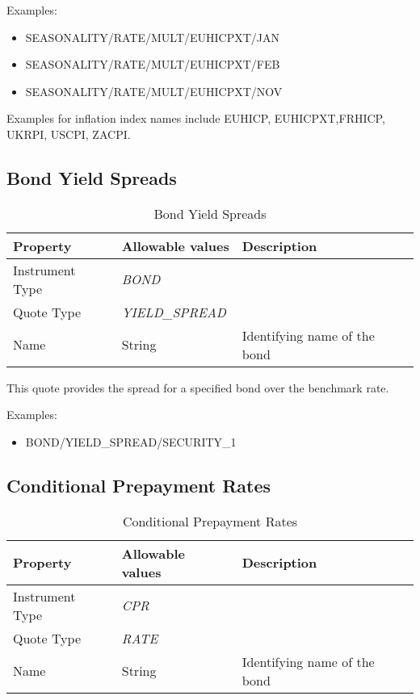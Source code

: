 \medskip
Examples:
\begin{itemize}
\item SEASONALITY/RATE/MULT/EUHICPXT/JAN
\item SEASONALITY/RATE/MULT/EUHICPXT/FEB
\item SEASONALITY/RATE/MULT/EUHICPXT/NOV
\end{itemize}

Examples for inflation index names include EUHICP, EUHICPXT,FRHICP, UKRPI, USCPI, ZACPI.

\subsection{Bond Yield Spreads}

\begin{table}[H]
\centering
  \begin{tabular}{|p{3cm}|p{3.5cm}|p{7cm}|}
  \hline
  {\bf Property} & {\bf Allowable values} & {\bf Description} \\ \hline
    Instrument Type & \emph{BOND} & \\ \hline
    Quote Type & \emph{YIELD\_SPREAD} & \\ \hline
    Name & String & Identifying name of the bond \\ \hline
  \end{tabular}
  \caption{Bond Yield Spreads}
  \label{tab:bondyieldspread_quote}
\end{table}

This quote provides the spread for a specified bond over the benchmark rate.

\medskip
Examples:
\begin{itemize}
	\item BOND/YIELD\_SPREAD/SECURITY\_1
\end{itemize}

\subsection{Conditional Prepayment Rates}

\begin{table}[H]
\centering
  \begin{tabular}{|p{3cm}|p{3.5cm}|p{7cm}|}
  \hline
  {\bf Property} & {\bf Allowable values} & {\bf Description} \\ \hline
    Instrument Type & \emph{CPR} & \\ \hline
    Quote Type & \emph{RATE} & \\ \hline
    Name & String & Identifying name of the bond \\ \hline
  \end{tabular}
  \caption{Conditional Prepayment Rates}
  \label{tab:cpr_quote}
\end{table}


